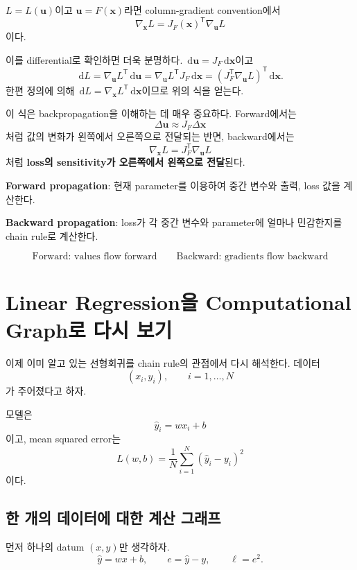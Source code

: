 \documentclass[11pt,a4paper]{article}
\newcommand{\grad}{\nabla}
\newcommand{\vect}[1]{\bm{#1}}
\newcommand{\T}{^{\mathsf T}}
\newcommand{\dd}{\,\mathrm d}
\begin{document}
$L=L(\vect{u})$이고 $\vect{u}=F(\vect{x})$라면 column-gradient convention에서
\[
\boxed{
\grad_{\vect{x}}L
=
J_F(\vect{x})\T
\grad_{\vect{u}}L
}
\]
이다.

이를 differential로 확인하면 더욱 분명하다. $\dd\vect{u}=J_F\dd\vect{x}$이고
\[
\dd L
=
\grad_{\vect{u}}L\T\dd\vect{u}
=
\grad_{\vect{u}}L\T J_F\dd\vect{x}
=
\left(J_F\T\grad_{\vect{u}}L\right)\T\dd\vect{x}.
\]
한편 정의에 의해 $\dd L=\grad_{\vect{x}}L\T\dd\vect{x}$이므로 위의 식을 얻는다.

이 식은 backpropagation을 이해하는 데 매우 중요하다. Forward에서는
\[
\Delta\vect{u}\approx J_F\Delta\vect{x}
\]
처럼 값의 변화가 왼쪽에서 오른쪽으로 전달되는 반면, backward에서는
\[
\grad_{\vect{x}}L=J_F\T\grad_{\vect{u}}L
\]
처럼 \textbf{loss의 sensitivity가 오른쪽에서 왼쪽으로 전달}된다.

\begin{mlbox}
\textbf{Forward propagation}: 현재 parameter를 이용하여 중간 변수와 출력, loss 값을 계산한다.

\textbf{Backward propagation}: loss가 각 중간 변수와 parameter에 얼마나 민감한지를 chain rule로 계산한다.

\[
\boxed{
\text{Forward: values flow forward}
\qquad
\text{Backward: gradients flow backward}
}
\]
\end{mlbox}

\section{Linear Regression을 Computational Graph로 다시 보기}

이제 이미 알고 있는 선형회귀를 chain rule의 관점에서 다시 해석한다.
데이터
\[
(x_i,y_i),\qquad i=1,\ldots,N
\]
가 주어졌다고 하자.

모델은
\[
\widehat y_i=wx_i+b
\]
이고, mean squared error는
\[
\boxed{
L(w,b)
=
\frac{1}{N}
\sum_{i=1}^N
(\widehat y_i-y_i)^2
}
\]
이다.

\subsection{한 개의 데이터에 대한 계산 그래프}

먼저 하나의 datum $(x,y)$만 생각하자.
\[
\widehat y=wx+b,
\qquad
e=\widehat y-y,
\qquad
\ell=e^2.
\]
\end{document}
